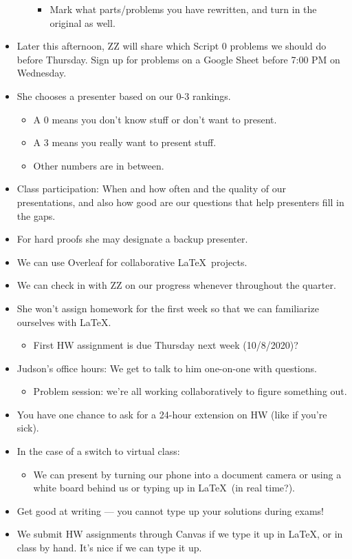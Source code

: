 \documentclass[titlepage]{article}
\theoremstyle{definition}
\begin{document}
\begin{itemize}
\begin{itemize}
        \begin{itemize}
            \item Mark what parts/problems you have rewritten, and turn in the original as well.
        \end{itemize}
    \end{itemize}
    \item Later this afternoon, ZZ will share which Script 0 problems we should do before Thursday. Sign up for problems on a Google Sheet before 7:00 PM on Wednesday.
    \item She chooses a presenter based on our 0-3 rankings.
    \begin{itemize}
        \item A 0 means you don't know stuff or don't want to present.
        \item A 3 means you really want to present stuff.
        \item Other numbers are in between.
    \end{itemize}
    \item Class participation: When and how often and the quality of our presentations, and also how good are our questions that help presenters fill in the gaps.
    \item For hard proofs she may designate a backup presenter.
    \item We can use Overleaf for collaborative \LaTeX\ projects.
    \item We can check in with ZZ on our progress whenever throughout the quarter.
    \item She won't assign homework for the first week so that we can familiarize ourselves with \LaTeX.
    \begin{itemize}
        \item First HW assignment is due Thursday next week (10/8/2020)?
    \end{itemize}
    \item Judson's office hours: We get to talk to him one-on-one with questions.
    \begin{itemize}
        \item Problem session: we're all working collaboratively to figure something out.
    \end{itemize}
    \item You have one chance to ask for a 24-hour extension on HW (like if you're sick).
    \item In the case of a switch to virtual class:
    \begin{itemize}
        \item We can present by turning our phone into a document camera or using a white board behind us or typing up in \LaTeX\ (in real time?).
    \end{itemize}
    \item Get good at writing --- you cannot type up your solutions during exams!
    \item We submit HW assignments through Canvas if we type it up in \LaTeX, or in class by hand. It's nice if we can type it up.
\end{itemize}
\end{document}
